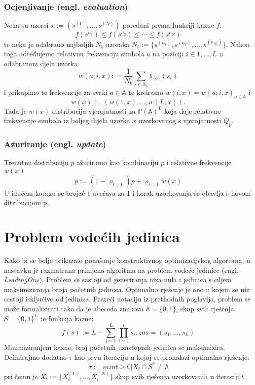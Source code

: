 \documentclass[times, utf8, zavrsni]{fer}
\begin{document}
\subsection{Ocjenjivanje (engl. \textit{evaluation})}
Neka su uzorci $x := (s^{(1)},...,s^{(N)})$ poredani prema funkciji kazne $f$:
$$
f(s^{n_1}) \leq f(s^{n_2}) \leq \cdots \leq f(s^{n_N})
$$
te neka je odabrano najboljih $N_b$ uzoraka $N_b := \{ s^{(n_1)}, s^{(n_2)},...,s^{(n_{N_b})} \}$. Nakon toga određujemo relativnu frekvenciju simbola $a$ na poziciji $i \in {1,..., L}$
u odabranom djelu uzorka
$$
w(a; i, x) : = \frac{1}{N_b} \sum_{s \in N_b} \mathds{1}_{\{a\}}(s_i)
$$
i prikupimo te frekvencije za svaki $a \in \mathbb{A}$ te kreiramo $w(i, x) = w(a;i, x)_{a \in \mathbb{A}}$ i
$$
w(x) := (w(1, x),...,w(L, x)).
$$
Tada je $w(x)$ distribucija vjerojatnosti za $\mathbb{P}(\mathbb{A})^L$ koja daje relativne frekvencije simbola iz boljeg dijela uzorka $x$ uzorkovanog s vjerojatnosti $Q_p$.

\subsection{Ažuriranje (engl. \textit{update})}
Trenutnu distribuciju $p$ ažuriramo kao kombinaciju $p$ i relativne frekvencije $w(x)$
$$
p := (1 - \varrho_{t+1})p + \varrho_{t+1} w(x)
$$
U idućem koraku se brojač t uvećava za 1 i korak uzorkovanja se obavlja s novom ditribucijom p.


\chapter{Problem vodećih jedinica}
Kako bi se bolje prikazalo ponašanje konstruktivnog optimizacijskog algoritma, u nastavku je razmatrana primjena algoritma na
problem vodeće jedinice (engl. \textit{LeadingOne}). Problem se sastoji od generiranja niza nula i jedinica s ciljem maksimiziranja broja početnih jedinica. Optimalno
rješenje je ono u kojem se niz sastoji isključivo od jedinica. Prateći notaciju iz prethodnih poglavlja, problem se može formalizirati tako da
je abeceda znakova $\mathbb{A} = \{0, 1\}$, skup svih rješenja $S = \{0, 1\}^L$ te funkcija kazne:
$$
f(s) := L - \sum^L_{l=1} \prod^l_{i=1} s_i, za s = (s_1,..., s_L)
$$
Minimiziranjem kazne, broj početnih uzastopnih jedinica se maksimizira.
Definirajmo dodatno $\tau$ kao prvu iteraciju u kojoj se pronalazi optimalno rješenje:
$$
\tau := min{t \geq 0 | X_t \cap S^* \neq \emptyset}
$$
pri čemu je $X_t :=  \{ X^{(1)}_t,...,X^{(N)}_t \} $ skup svih rješenja uzorkovanih u iteraciji $t$.
\end{document}
